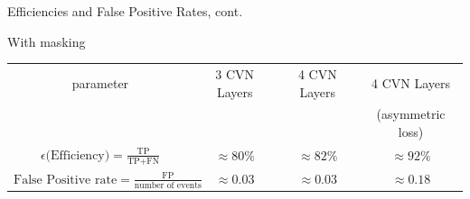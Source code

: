 \begin{frame}{Efficiencies and False Positive Rates, cont.}
\begin{table}[]
\centering
    {\Large With masking} \\
    \vspace{.5em}
\begin{tabular}{cccc}
    parameter & 3 CVN Layers & 4 CVN Layers & 4 CVN Layers \\
              &              &              & (asymmetric loss) \\ [0.3em]
    $ \epsilon \textrm{(Efficiency)} = \frac{\mbox{TP}}{\mbox{TP} + \mbox{FN}} $ &  $ \approx 80\% $  & $ \approx 82\% $ & $ \approx 92\% $ \\ [0.7em]
    $ \textrm{False Positive rate} = \frac{\mbox{FP}}{\mbox{number of events}} $ &  $\approx 0.03  $  & $\approx 0.03  $ & $ \approx 0.18 $ \\
 \end{tabular}
\end{table}
\end{frame}
